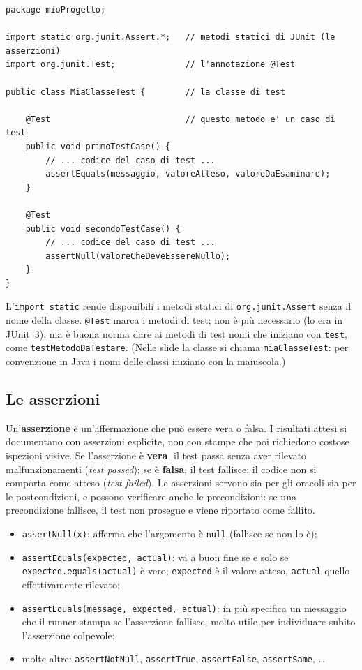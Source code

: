 \begin{lstlisting}[style=java]
package mioProgetto;

import static org.junit.Assert.*;   // metodi statici di JUnit (le asserzioni)
import org.junit.Test;              // l'annotazione @Test

public class MiaClasseTest {        // la classe di test

    @Test                           // questo metodo e' un caso di test
    public void primoTestCase() {
        // ... codice del caso di test ...
        assertEquals(messaggio, valoreAtteso, valoreDaEsaminare);
    }

    @Test
    public void secondoTestCase() {
        // ... codice del caso di test ...
        assertNull(valoreCheDeveEssereNullo);
    }
}
\end{lstlisting}

L'\texttt{import static} rende disponibili i metodi statici di \texttt{org.junit.Assert} senza il nome della classe.
\texttt{@Test} marca i metodi di test; non è più necessario (lo era in JUnit~3), ma è buona norma dare ai metodi di test
nomi che iniziano con \texttt{test}, come \texttt{testMetodoDaTestare}. (Nelle slide la classe si chiama
\texttt{miaClasseTest}: per convenzione in Java i nomi delle classi iniziano con la maiuscola.)

\subsection{Le asserzioni}

Un'\textbf{asserzione} è un'affermazione che può essere vera o falsa. I risultati attesi si documentano con asserzioni
esplicite, non con stampe che poi richiedono costose ispezioni visive. Se l'asserzione è \textbf{vera}, il test passa
senza aver rilevato malfunzionamenti (\textit{test passed}); se è \textbf{falsa}, il test fallisce: il codice non si
comporta come atteso (\textit{test failed}). Le asserzioni servono sia per gli oracoli sia per le postcondizioni, e
possono verificare anche le precondizioni: se una precondizione fallisce, il test non prosegue e viene riportato come
fallito.

\begin{itemize}
  \item \texttt{assertNull(x)}: afferma che l'argomento è \texttt{null} (fallisce se non lo è);
  \item \texttt{assertEquals(expected, actual)}: va a buon fine se e solo se \texttt{expected.equals(actual)} è vero;
        \texttt{expected} è il valore atteso, \texttt{actual} quello effettivamente rilevato;
  \item \texttt{assertEquals(message, expected, actual)}: in più specifica un messaggio che il runner stampa se
        l'asserzione fallisce, molto utile per individuare subito l'asserzione colpevole;
  \item molte altre: \texttt{assertNotNull}, \texttt{assertTrue}, \texttt{assertFalse}, \texttt{assertSame}, \ldots
\end{itemize}

